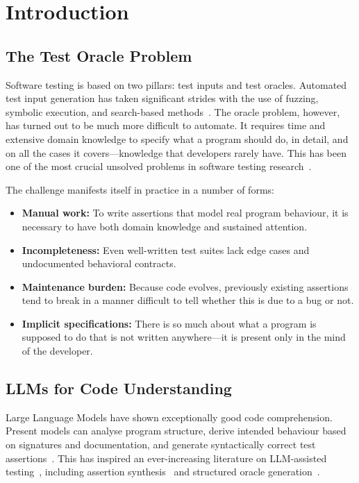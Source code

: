 \documentclass[conference]{IEEEtran}
\begin{document}
\section{Introduction}

\subsection{The Test Oracle Problem}

Software testing is based on two pillars: test inputs and test oracles. Automated test input generation has taken significant strides with the use of fuzzing, symbolic execution, and search-based methods~\cite{fraser2011evosuite,barr2015oracle}. The oracle problem, however, has turned out to be much more difficult to automate. It requires time and extensive domain knowledge to specify what a program should do, in detail, and on all the cases it covers---knowledge that developers rarely have. This has been one of the most crucial unsolved problems in software testing research~\cite{barr2015oracle,pezze2014automated}.

The challenge manifests itself in practice in a number of forms:

\begin{itemize}
\item \textbf{Manual work:} To write assertions that model real program behaviour, it is necessary to have both domain knowledge and sustained attention.
\item \textbf{Incompleteness:} Even well-written test suites lack edge cases and undocumented behavioral contracts.
\item \textbf{Maintenance burden:} Because code evolves, previously existing assertions tend to break in a manner difficult to tell whether this is due to a bug or not.
\item \textbf{Implicit specifications:} There is so much about what a program is supposed to do that is not written anywhere---it is present only in the mind of the developer.
\end{itemize}

\subsection{LLMs for Code Understanding}

Large Language Models have shown exceptionally good code comprehension. Present models can analyse program structure, derive intended behaviour based on signatures and documentation, and generate syntactically correct test assertions~\cite{jiang2024survey_codellm,davis2024understanding_llm_code,xu2022systematic}. This has inspired an ever-increasing literature on LLM-assisted testing~\cite{hayet2024chatassert,bodicoat2025understanding}, including assertion synthesis~\cite{hayet2024chatassert} and structured oracle generation~\cite{hossain2024togll}.
\end{document}
